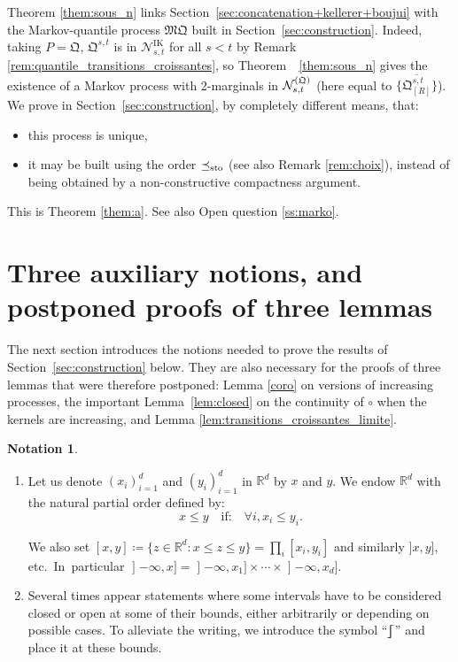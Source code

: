 \documentclass[JEP,XML,SOM,Unicode,NoEqCountersInSection,NoFloatCountersInSection,published]{cedram}
\theoremstyle{plain}
\theoremstyle{definition}
\newtheorem{notation}[them]{Notation} %
\newcommand{\como}{\mathfrak{Q}}
\newcommand{\mq}{\mathfrak{MQ}}
\newcommand{\IT}{\mathrm{IK}}
\newcommand{\eqdef}{\coloneqq}
\newcommand{\R}{\mathbb{R}}
\newcommand{\leqs}{\preceq_{\text{\rm sto}}}
\newcommand{\op}{\mathopen}
\newcommand{\rsemibracket}{\mathclose{\rfloor\hspace*{-.9ex}\lceil}}
\begin{document}
Theorem \ref{them:sous_n} links Section~\ref{sec:concatenation+kellerer+boujui} with the Markov-quantile process $\mq$ built in Section~\ref{sec:construction}. Indeed, taking $P=\como$,
$\como^{s,t}$ is in $\mathcal{N}_{s,t}^\IT$ for all $s<t$ by Remark \ref{rem:quantile_transitions_croissantes}, so Theorem~ \ref{them:sous_n} gives the existence of a Markov process with 2-marginals in $\mathcal{N}_{s,t}^{\rm (\como)}$ (here equal to $\overline{\{\como_{[R]}^{s,t}\}}$). We prove in Section~\ref{sec:construction}, by completely different means, that:
\begin{itemize}
\item
this process is unique,

\item
it may be built using the order $\leqs$ (see also Remark \ref{rem:choix}), instead of being obtained by a non-constructive compactness argument.
\end{itemize}
This is Theorem \ref{them:a}. See also Open question \ref{ss:marko}.

\section{Three auxiliary notions, and postponed proofs of three lemmas}\label{sec:auxiliaire}

The next section introduces the notions needed to prove the results of Section~\ref{sec:construction} below. They are also necessary for the proofs of three lemmas that were therefore postponed: Lemma \ref{coro} on versions of increasing processes, the important Lemma~\ref{lem:closed} on the continuity of $\circ$ when the kernels are increasing, and Lemma \ref{lem:transitions_croissantes_limite}.

\label{subsec:stochastic_order}

\skpt
\begin{notation}\label{notation:intervallesRd}
\begin{enumerate}
\item
 Let us denote $(x_i)_{i=1}^d$ and $(y_i)_{i=1}^d$ in $\R^d$ by $x$ and $y$. We endow $\R^d$ with the natural partial order defined by:
\[x\leqslant y\quad \text{if:}\quad\forall i,x_i\leqslant y_i.\]

We also set $[x,y]\eqdef\{z\in\R^d:x\leqslant z\leqslant y\}=\prod_i[x_i,y_i]$ and similarly $]x,y]$, etc.\ In~particular $\op]-\infty,x]=\op]-\infty,x_1]\times\cdots\times\op]-\infty,x_d]$.

\item
Several times appear statements where some intervals have to be considered closed or open at some of their bounds, either arbitrarily or depending on possible cases. To alleviate the writing, we introduce the symbol ``$\rsemibracket$'' and place it at these bounds.
\end{enumerate}
\end{notation}
\end{document}
